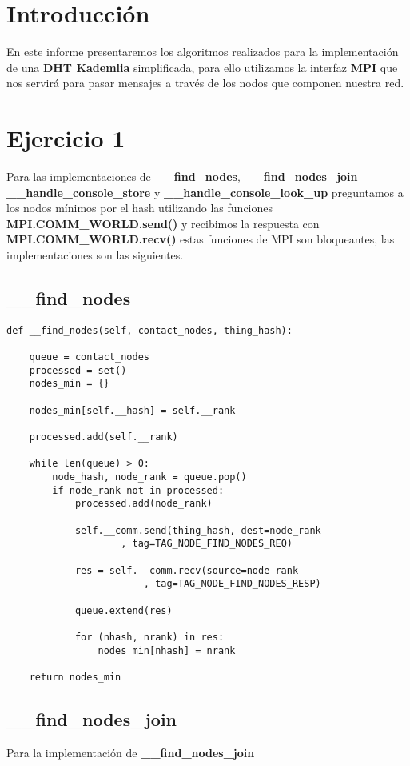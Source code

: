 \section{Introducción}
En este informe presentaremos los algoritmos realizados para la implementación de una \textbf{DHT Kademlia} simplificada, para ello utilizamos la interfaz \textbf{MPI} que nos servirá para pasar mensajes a través de los nodos que componen nuestra red.

\section{Ejercicio 1}
Para las implementaciones de \textbf{\_\_find\_nodes}, \textbf{\_\_find\_nodes\_join} \textbf{\_\_handle\_console\_store} y \textbf{\_\_handle\_console\_look\_up} preguntamos a los nodos mínimos por el hash utilizando las funciones \textbf{MPI.COMM\_WORLD.send()} y recibimos la respuesta con \textbf{MPI.COMM\_WORLD.recv()} estas funciones de MPI son bloqueantes, las implementaciones son las siguientes.

\subsection{\_\_find\_nodes}

\begin{lstlisting}
def __find_nodes(self, contact_nodes, thing_hash):

    queue = contact_nodes
    processed = set()
    nodes_min = {}

    nodes_min[self.__hash] = self.__rank

    processed.add(self.__rank)

    while len(queue) > 0:
        node_hash, node_rank = queue.pop()
        if node_rank not in processed:
            processed.add(node_rank)

            self.__comm.send(thing_hash, dest=node_rank
					, tag=TAG_NODE_FIND_NODES_REQ)

            res = self.__comm.recv(source=node_rank
						, tag=TAG_NODE_FIND_NODES_RESP)

            queue.extend(res)
            
            for (nhash, nrank) in res:
                nodes_min[nhash] = nrank

    return nodes_min
\end{lstlisting}


\subsection{\_\_find\_nodes\_join}
Para la implementación de \textbf{\_\_find\_nodes\_join} 


